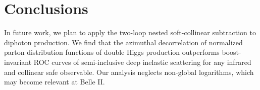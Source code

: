 \section{Conclusions}\label{sec:conclusions}

In future work, we plan to apply the two-loop nested soft-collinear
subtraction to diphoton production. We find that the azimuthal
decorrelation of normalized parton distribution functions of double
Higgs production outperforms boost-invariant ROC curves of
semi-inclusive deep inelastic scattering for any infrared and collinear
safe observable. Our analysis neglects non-global logarithms, which may
become relevant at Belle II.

